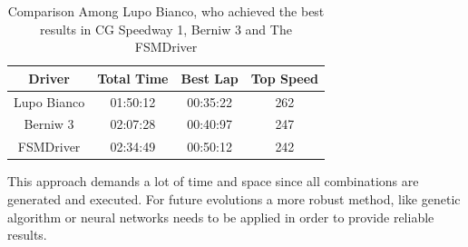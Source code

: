 \begin{table}[h]
\renewcommand{\arraystretch}{1.3}
\caption{Comparison Among Lupo Bianco, who achieved the best results in CG Speedway 1, Berniw 3 and The FSMDriver}
\label{results_table}
\centering

\begin{tabular}{c||c||c||c}
\hline \bfseries Driver &\bfseries Total Time &\bfseries Best Lap &\bfseries Top Speed \\
\hline
\hline Lupo Bianco & 01:50:12 & 00:35:22 & 262 \\
\hline Berniw 3 & 02:07:28 & 00:40:97 & 247 \\ 
\hline FSMDriver & 02:34:49 & 00:50:12 & 242 \\ 
\hline 
\end{tabular}
\end{table}
This approach demands a lot of time and space since all combinations are generated and executed. For future evolutions a more robust method, like genetic algorithm or neural networks needs to be applied in order to provide reliable results.
